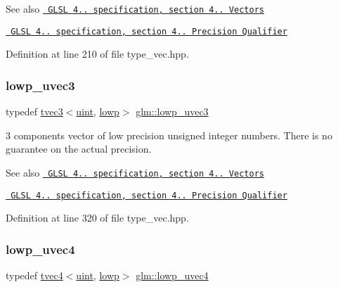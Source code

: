 \begin{DoxySeeAlso}{See also}
\href{http://www.opengl.org/registry/doc/GLSLangSpec.4.20.8.pdf}{\texttt{ G\+L\+SL 4.. specification, section 4.. Vectors}} 

\href{http://www.opengl.org/registry/doc/GLSLangSpec.4.20.8.pdf}{\texttt{ G\+L\+SL 4.. specification, section 4.. Precision Qualifier}} 
\end{DoxySeeAlso}


Definition at line 210 of file type\+\_\+vec.\+hpp.

\mbox{\label{group__core__precision_gab6f49c51783c774550f5217aecabd1d9}} 
\subsubsection{\texorpdfstring{lowp\_uvec3}{lowp\_uvec3}}
{\footnotesize\ttfamily typedef \mbox{\hyperlink{structglm_1_1tvec3}{tvec3}}$<$\mbox{\hyperlink{group__core__precision_ga4fd29415871152bfb5abd588334147c8}{uint}}, \mbox{\hyperlink{namespaceglm_a0f04f086094c747d227af4425893f545ae161af3fc695e696ce3bf69f7332bc2d}{lowp}}$>$ \mbox{\hyperlink{group__core__precision_gab6f49c51783c774550f5217aecabd1d9}{glm\+::lowp\+\_\+uvec3}}}

3 components vector of low precision unsigned integer numbers. There is no guarantee on the actual precision.

\begin{DoxySeeAlso}{See also}
\href{http://www.opengl.org/registry/doc/GLSLangSpec.4.20.8.pdf}{\texttt{ G\+L\+SL 4.. specification, section 4.. Vectors}} 

\href{http://www.opengl.org/registry/doc/GLSLangSpec.4.20.8.pdf}{\texttt{ G\+L\+SL 4.. specification, section 4.. Precision Qualifier}} 
\end{DoxySeeAlso}


Definition at line 320 of file type\+\_\+vec.\+hpp.

\mbox{\label{group__core__precision_ga5bb34ee8aba0f936bc521850819fc762}} 
\subsubsection{\texorpdfstring{lowp\_uvec4}{lowp\_uvec4}}
{\footnotesize\ttfamily typedef \mbox{\hyperlink{structglm_1_1tvec4}{tvec4}}$<$\mbox{\hyperlink{group__core__precision_ga4fd29415871152bfb5abd588334147c8}{uint}}, \mbox{\hyperlink{namespaceglm_a0f04f086094c747d227af4425893f545ae161af3fc695e696ce3bf69f7332bc2d}{lowp}}$>$ \mbox{\hyperlink{group__core__precision_ga5bb34ee8aba0f936bc521850819fc762}{glm\+::lowp\+\_\+uvec4}}}

